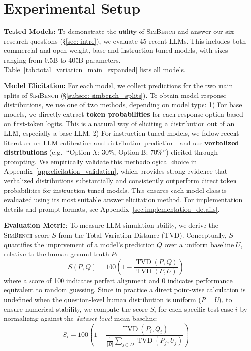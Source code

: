\documentclass{article} %
\begin{document}
\section{Experimental Setup}
\label{sec:experimental_setup}

\textbf{Tested Models:}
To demonstrate the utility of \textsc{SimBench} and answer our six research questions (\S\ref{sec: intro}), we evaluate 45 recent LLMs.
This includes both commercial and open-weight, base and instruction-tuned models, with sizes ranging from 0.5B to 405B parameters. 
Table~\ref{tab:total_variation_main_expanded} lists all models.



\textbf{Model Elicitation:}
For each model, we collect predictions for the two main splits of \textsc{SimBench} (\S\ref{subsec: simbench - splits}).
To obtain model response distributions, we use one of two methods, depending on model type: 
1) For base models, we directly extract \textbf{token probabilities} for each response option based on first-token logits.
This is a natural way of eliciting a distribution out of an LLM, especially a base LLM.
2) For instruction-tuned models, we follow recent literature on LLM calibration and distribution prediction~\citep{tian-etal-2023-just,wang-etal-2024-answer-c, meister-etal-2025-benchmarking} and use \textbf{verbalized distributions} (e.g., ``Option A: 30\%, Option B: 70\%'') elicited through prompting. We empirically validate this methodological choice in Appendix~\ref{app:elicitation_validation}, which provides strong evidence that verbalized distributions substantially and consistently outperform direct token probabilities for instruction-tuned models. This ensures each model class is evaluated using its most suitable answer elicitation method. For implementation details and prompt formats, see Appendix~\ref{sec:implementation_details}.


\textbf{Evaluation Metric}:
To measure LLM simulation ability, we derive the \textsc{SimBench} score $S$ from the Total Variation Distance (TVD). Conceptually, $S$ quantifies the improvement of a model's prediction $Q$ over a uniform baseline $U$, relative to the human ground truth $P$:
\begin{equation}
S(P, Q) = 100 \left(1 - \frac{\operatorname{TVD}(P, Q)}{\operatorname{TVD}(P, U)}\right)
\end{equation}
where a score of 100 indicates perfect alignment and 0 indicates performance equivalent to random guessing. Since in practice a direct point-wise calculation is undefined when the question-level human distribution is uniform ($P=U$), to ensure numerical stability, we compute the score $S_i$ for each specific test case $i$ by normalizing against the \textit{dataset-level} mean baseline:
\begin{equation}
S_i = 100 \left(1 - \frac{\operatorname{TVD}(P_i, Q_i)}{\frac{1}{|D|} \sum_{j \in D} \operatorname{TVD}(P_j, U_j)}\right)
\end{equation}
\end{document}
